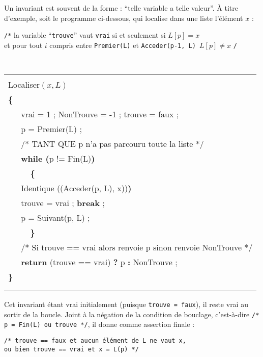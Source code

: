 Un invariant est souvent de la forme : ``telle variable  a telle  valeur''.
\`A titre d'exemple, soit le programme ci-dessous, qui localise
dans une liste l'\'el\'ement $x$ :

   {\tt /*} la variable ``{\tt trouve}'' vaut {\tt vrai} si et seulement si $L[p]=x$\\
   et pour tout $i$ compris entre {\tt Premier(L)} et {\tt Acceder(p-1, L)
   $L[p]\neq x$} {\tt */ }

\begin{center}{\tt
\begin{tabular}{|ll|}
\hline
& \\
\multicolumn{2}{|l|}{Localiser$(x, L)$}\\
{\bf \{}  & \\
    & vrai = 1 ; NonTrouve = -1 ; trouve = faux ; \\
    & p = Premier(L) ;     \\
    & /* TANT QUE p n'a pas parcouru toute la liste */   \\
    & {\bf while (}p !=  Fin(L){\bf)} \\
	& {\bf ~~\{} \\
    & \hspace{3mm}{\bf if (}Identique ((Acceder(p, L), x)){\bf)} \\
    & \hspace{6mm}trouve = vrai ; {\bf break} ;  \\
    & \hspace{3mm}{\bf else} p =  Suivant(p, L) ;  \\
	& {\bf ~~\}} \\
	& /* Si trouve == vrai alors renvoie p sinon renvoie NonTrouve */\\
    & {\bf return } (trouve == vrai) {\bf ?} p {\bf : } NonTrouve ; \\
{\bf \}}  & \\
& \\
\hline
\multicolumn{2}{c}{}\\
\end{tabular}} \end{center}


Cet invariant \'etant vrai initialement (puisque {\tt trou\-ve = faux}), il
reste vrai au sortir de la boucle. Joint \`a la n\'egation de la condition de
bouclage, c'est-\`a-dire {\tt /* p = Fin(L) ou trouve */}, il donne com\-me
assertion finale : 

   {\tt /* trouve == faux et aucun \'el\'ement de L ne vaut x, \\
   ou bien trouve == vrai et x = L(p) */}

